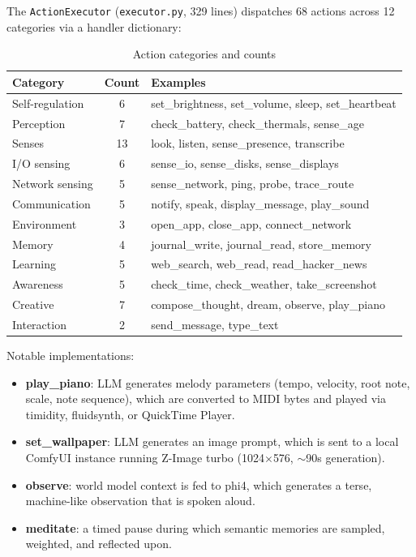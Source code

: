 \documentclass[11pt,oneside]{article}
\begin{document}
The \texttt{ActionExecutor} (\texttt{executor.py}, 329 lines) dispatches 68 actions across 12 categories via a handler dictionary:

\begin{table}[H]
\centering
\caption{Action categories and counts}
\label{tab:actions}
\small
\begin{tabular}{l c l}
\toprule
\textbf{Category} & \textbf{Count} & \textbf{Examples} \\
\midrule
Self-regulation & 6  & set\_brightness, set\_volume, sleep, set\_heartbeat \\
Perception      & 7  & check\_battery, check\_thermals, sense\_age \\
Senses          & 13 & look, listen, sense\_presence, transcribe \\
I/O sensing     & 6  & sense\_io, sense\_disks, sense\_displays \\
Network sensing & 5  & sense\_network, ping, probe, trace\_route \\
Communication   & 5  & notify, speak, display\_message, play\_sound \\
Environment     & 3  & open\_app, close\_app, connect\_network \\
Memory          & 4  & journal\_write, journal\_read, store\_memory \\
Learning        & 5  & web\_search, web\_read, read\_hacker\_news \\
Awareness       & 5  & check\_time, check\_weather, take\_screenshot \\
Creative        & 7  & compose\_thought, dream, observe, play\_piano \\
Interaction     & 2  & send\_message, type\_text \\
\bottomrule
\end{tabular}
\end{table}

Notable implementations:

\begin{itemize}
  \item \textbf{play\_piano}: LLM generates melody parameters (tempo, velocity, root note, scale, note sequence), which are converted to MIDI bytes and played via timidity, fluidsynth, or QuickTime Player.
  \item \textbf{set\_wallpaper}: LLM generates an image prompt, which is sent to a local ComfyUI instance running Z-Image turbo (1024$\times$576, $\sim$90s generation).
  \item \textbf{observe}: world model context is fed to phi4, which generates a terse, machine-like observation that is spoken aloud.
  \item \textbf{meditate}: a timed pause during which semantic memories are sampled, weighted, and reflected upon.
\end{itemize}
\end{document}
